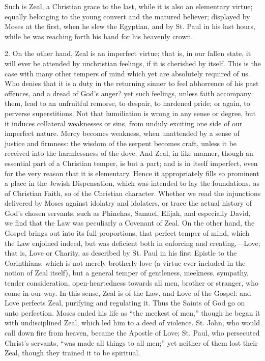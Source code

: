 Such is Zeal, a Christian grace to the last, while it is also an
elementary virtue; equally belonging to the young convert and the
matured believer; displayed by Moses at the first, when he slew the
Egyptian, and by St. Paul in his last hours, while he was reaching forth
his hand for his heavenly crown.

2. On the other hand, Zeal is an imperfect virtue; that is, in our
fallen state, it will ever be attended by unchristian feelings, if it is
cherished by itself. This is the case with many other tempers of mind
which yet are absolutely required of us. Who denies that it is a duty in
the returning sinner to feel abhorrence of his past offences, and a
dread of God's anger? yet such feelings, unless faith accompany them,
lead to an unfruitful remorse, to despair, to hardened pride; or again,
to perverse superstitions. Not that humiliation is wrong in any sense or
degree, but it induces collateral weaknesses or sins, from unduly
exciting one side of our imperfect nature. Mercy becomes weakness, when
unattended by a sense of justice and firmness: the wisdom of the serpent
becomes craft, unless it be received into the harmlessness of the dove.
And Zeal, in like manner, though an essential part of a Christian
temper, is but a part; and is in itself imperfect, even for the very
reason that it is elementary. Hence it appropriately fills so prominent
a place in the Jewish Dispensation, which was intended to lay the
foundations, as of Christian Faith, so of the Christian character.
Whether we read the injunctions delivered by Moses against idolatry and
idolaters, or trace the actual history of God's chosen servants, such as
Phinehas, Samuel, Elijah, and especially David, we find that the Law was
peculiarly a Covenant of Zeal. On the other hand, the Gospel brings out
into its full proportions, that perfect temper of mind, which the Law
enjoined indeed, but was deficient both in enforcing and creating,—Love; that is, Love or Charity, as described by St. Paul in
his first Epistle to the Corinthians, which is not merely brotherly-love
(a virtue ever included in the notion of Zeal itself), but a general
temper of gentleness, meekness, sympathy, tender consideration,
open-heartedness towards all men, brother or stranger, who come in our
way. In this sense, Zeal is of the Law, and Love of the Gospel: and Love
perfects Zeal, purifying and regulating it. Thus the Saints of God go on
unto perfection. Moses ended his life as ``the meekest of men,''
though he began it with undisciplined Zeal, which led him to a deed of
violence. St. John, who would call down fire from heaven, became the
Apostle of Love; St. Paul, who persecuted Christ's servants, ``was made
all things to all men;'' yet neither of them lost their Zeal, though they
trained it to be spiritual.

